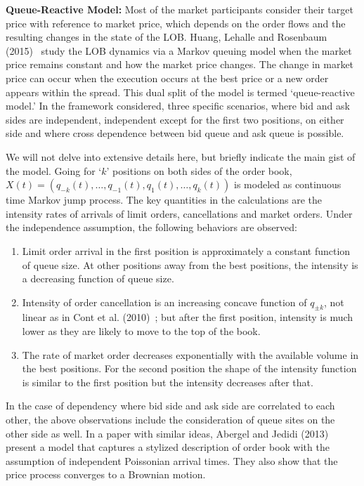 \noindent\textbf{Queue-Reactive Model:} Most of the market participants consider their target price with reference to market price, which depends on the order flows and the resulting changes in the state of the LOB. Huang, Lehalle and Rosenbaum (2015)~\cite{hlehros} study the LOB dynamics via a Markov queuing model when the market price remains constant and how the market price changes. The change in market price can occur when the execution occurs at the best price or a new order appears within the spread. This dual split of the model is termed `queue-reactive model.' In the framework considered, three specific scenarios, where bid and ask sides are independent, independent except for the first two positions, on either side and where cross dependence between bid queue and ask queue is possible.


We will not delve into extensive details here, but briefly indicate the main gist of the model. Going for `$k$' positions on both sides of the order book, $X(t)= (q_{-k}(t),\ldots,q_{-1}(t),q_1(t),\ldots,q_k(t))$ is modeled as continuous time Markov jump process. The key quantities in the calculations are the intensity rates of arrivals of limit orders, cancellations and market orders. Under the independence assumption, the following behaviors are observed:

\begin{enumerate}[--]
\item Limit order arrival in the first position is approximately a constant function of queue size. At other positions away from the best positions, the intensity is a decreasing function of queue size. 

\item Intensity of order cancellation is an increasing concave function of $q_{\pm k}$, not linear as in Cont et al. (2010)~\cite{contstoi}; but after the first position, intensity is much lower as they are likely to move to the top of the book.

\item The rate of market order decreases exponentially with the available volume in the best positions. For the second position the shape of the intensity function is similar to the first position but the intensity decreases after that.
\end{enumerate}


In the case of dependency where bid side and ask side are correlated to each other, the above observations include the consideration of queue sites on the other side as well. In a paper with similar ideas, Abergel and Jedidi (2013)~\cite{aberjed} present a model that captures a stylized description of order book with the assumption of independent Poissonian arrival times. They also show that the price process converges to a Brownian motion. \twomedskip




